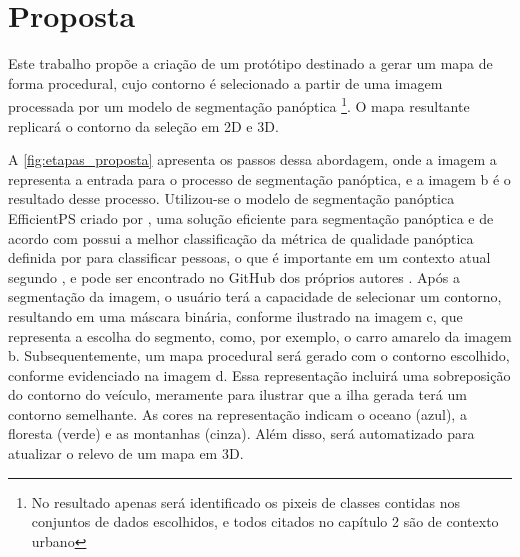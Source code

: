 \section{Proposta}

Este trabalho propõe a criação de um protótipo destinado a gerar um mapa de forma procedural, cujo contorno é selecionado a partir de uma imagem processada por um modelo de segmentação panóptica \footnote{No resultado apenas será identificado os pixeis de classes contidas nos conjuntos de dados escolhidos, e todos citados no capítulo 2 são de contexto urbano}. O mapa resultante replicará o contorno da seleção em 2D e 3D.

A \cref{fig:etapas_proposta} apresenta os passos dessa abordagem, onde a imagem a representa a entrada para o processo de segmentação panóptica, e a imagem b é o resultado desse processo. Utilizou-se o modelo de segmentação panóptica EfficientPS criado por , uma solução eficiente para segmentação panóptica e de acordo com  possui a melhor classificação da métrica de qualidade panóptica definida por  para classificar pessoas, o que é importante em um contexto atual segundo 
, e pode ser encontrado no GitHub dos próprios autores . Após a segmentação da imagem, o usuário terá a capacidade de selecionar um contorno, resultando em uma máscara binária, conforme ilustrado na imagem c, que representa a escolha do segmento, como, por exemplo, o carro amarelo da imagem b. Subsequentemente, um mapa procedural será gerado com o contorno escolhido, conforme evidenciado na imagem d. Essa representação incluirá uma sobreposição do contorno do veículo, meramente para ilustrar que a ilha gerada terá um contorno semelhante. As cores na representação indicam o oceano (azul), a floresta (verde) e as montanhas (cinza). Além disso, será automatizado para atualizar o relevo de um mapa em 3D.

%


